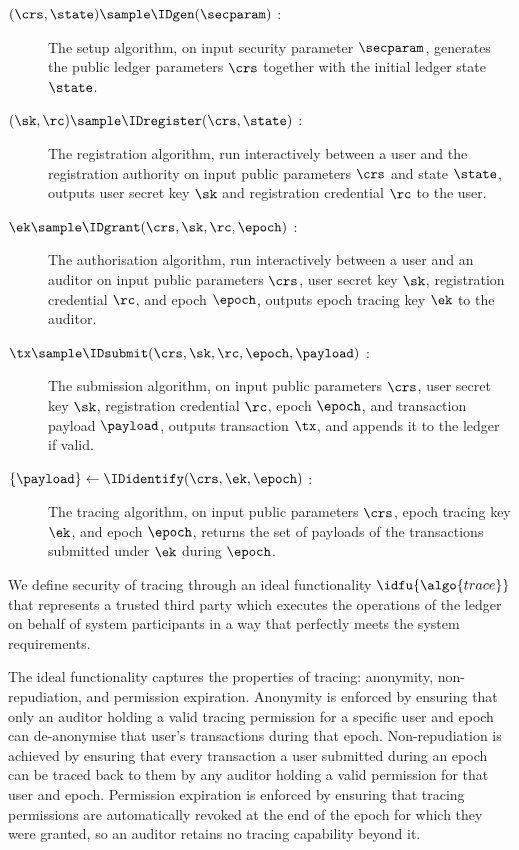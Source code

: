 \begin{description}

  \item[$(\crs,\state) \sample \IDgen(\secparam)$ :] The setup algorithm, on
    input security parameter $\secparam$, generates the public ledger
    parameters $\crs$ together with the initial ledger state $\state$.

  \item[$(\sk,\rc) \sample \IDregister(\crs,\state)$ :] The registration
    algorithm, run interactively between a user and the registration authority
    on input public parameters $\crs$ and state $\state$, outputs user secret
    key $\sk$ and registration credential $\rc$ to the user.

  \item[$\ek \sample \IDgrant(\crs,\sk,\rc,\epoch)$ :] The authorisation
    algorithm, run interactively between a user and an auditor on input public
    parameters $\crs$, user secret key $\sk$, registration credential $\rc$,
    and epoch $\epoch$, outputs epoch tracing key $\ek$ to the auditor.

  \item[$\tx \sample \IDsubmit(\crs,\sk,\rc,\epoch,\payload)$ :] The submission
    algorithm, on input public parameters $\crs$, user secret key $\sk$,
    registration credential $\rc$, epoch $\epoch$, and transaction payload
    $\payload$, outputs transaction $\tx$, and appends it to the ledger if
    valid.

  \item[$\{\payload\} \leftarrow \IDidentify(\crs,\ek,\epoch)$ :] The tracing
    algorithm, on input public parameters $\crs$, epoch tracing key $\ek$, and
    epoch $\epoch$, returns the set of payloads of the transactions submitted
    under $\ek$ during $\epoch$.

\end{description}

We define security of tracing through an ideal functionality
$\idfu{\algo{trace}}$ that represents a trusted third party which executes the
operations of the ledger on behalf of system participants in a way that
perfectly meets the system requirements.

The ideal functionality captures the properties of tracing: anonymity,
non-repudiation, and permission expiration. Anonymity is enforced by ensuring
that only an auditor holding a valid tracing permission for a specific user and
epoch can de-anonymise that user's transactions during that epoch.
Non-repudiation is achieved by ensuring that every transaction a user submitted
during an epoch can be traced back to them by any auditor holding a valid
permission for that user and epoch. Permission expiration is enforced by
ensuring that tracing permissions are automatically revoked at the end of the
epoch for which they were granted, so an auditor retains no tracing capability
beyond it.

